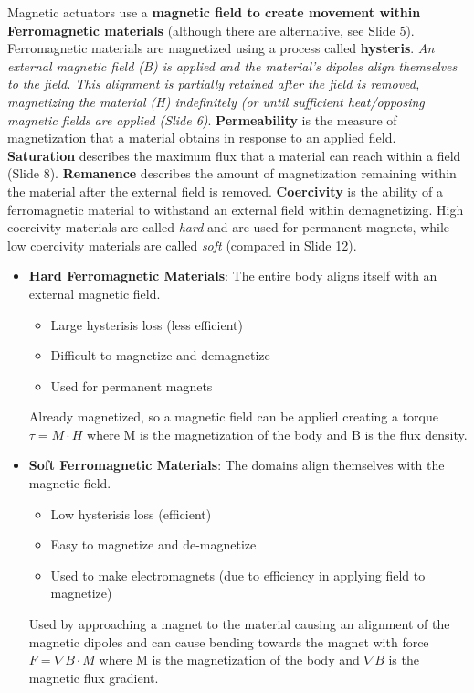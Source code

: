 \documentclass[onecolumn,a4paper]{article}
\begin{document}
Magnetic actuators use a \textbf{magnetic field to create movement within Ferromagnetic materials} (although there are alternative, see Slide 5). Ferromagnetic materials are magnetized using a process called \textbf{hysteris}. \emph{An external magnetic field (B) is applied and the material's dipoles align themselves to the field. This alignment is partially retained after the field is removed, magnetizing the material (H) indefinitely (or until sufficient heat/opposing magnetic fields are applied (Slide 6)}. \textbf{Permeability} is the measure of magnetization that a material obtains in response to an applied field. \textbf{Saturation} describes the maximum flux that a material can reach within a field (Slide 8). \textbf{Remanence} describes the amount of magnetization remaining within the material after the external field is removed. \textbf{Coercivity} is the ability of a ferromagnetic material to withstand an external field within demagnetizing. High coercivity materials are called \emph{hard} and are used for permanent magnets, while low coercivity materials are called \emph{soft} (compared in Slide 12).
\begin{itemize}
    \item \textbf{Hard Ferromagnetic Materials}: The entire body aligns itself with an external magnetic field.
    \begin{itemize}
        \item Large hysterisis loss (less efficient)
        \item Difficult to magnetize and demagnetize
        \item Used for permanent magnets
    \end{itemize}
    Already magnetized, so a magnetic field can be applied creating a torque $\tau = M\cdot H$ where M is the magnetization of the body and B is the flux density.
    \item \textbf{Soft Ferromagnetic Materials}: The domains align themselves with the magnetic field.
    \begin{itemize}
        \item Low hysterisis loss (efficient)
        \item Easy to magnetize and de-magnetize
        \item Used to make electromagnets (due to efficiency in applying field to magnetize)
    \end{itemize}
    Used by approaching a magnet to the material causing an alignment of the magnetic dipoles and can cause bending towards the magnet with force $F = \nabla B \cdot M$ where M is the magnetization of the body and $\nabla B$ is the magnetic flux gradient.
\end{itemize}
\end{document}
